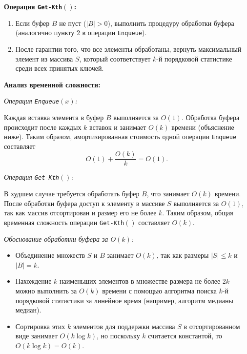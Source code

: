 \documentclass[11pt]{article}
\renewcommand{\leq}{\leqslant}  %
\begin{document}
\begin{solution}
    \textbf{Операция \texttt{Get-Kth}$()$:}

    \begin{enumerate}
        \item Если буфер $B$ не пуст ($|B| > 0$), выполнить процедуру обработки буфера (аналогично пункту 2 в операции \texttt{Enqueue}).
        \item После гарантии того, что все элементы обработаны, вернуть максимальный элемент из массива $S$, который соответствует $k$-й порядковой статистике среди всех принятых ключей.
    \end{enumerate}

    \textbf{Анализ временной сложности:}

    \textit{Операция \texttt{Enqueue}$(x)$:}

    Каждая вставка элемента в буфер $B$ выполняется за $O(1)$. Обработка буфера происходит после каждых $k$ вставок и занимает $O(k)$ времени (объяснение ниже). Таким образом, амортизированная стоимость одной операции \texttt{Enqueue} составляет
    \[
        O(1) + \frac{O(k)}{k} = O(1).
    \]

    \textit{Операция \texttt{Get-Kth}$()$:}

    В худшем случае требуется обработать буфер $B$, что занимает $O(k)$ времени. После обработки буфера доступ к элементу в массиве $S$ выполняется за $O(1)$, так как массив отсортирован и размер его не более $k$. Таким образом, общая временная сложность операции \texttt{Get-Kth}$()$ составляет $O(k)$.

    \textit{Обоснование обработки буфера за $O(k)$:}

    \begin{itemize}
        \item Объединение множеств $S$ и $B$ занимает $O(k)$, так как размеры $|S| \leq k$ и $|B| = k$.
        \item Нахождение $k$ наименьших элементов в множестве размера не более $2k$ можно выполнить за $O(k)$ времени с помощью алгоритма поиска $k$-й порядковой статистики за линейное время (например, алгоритм медианы медиан).
        \item Сортировка этих $k$ элементов для поддержки массива $S$ в отсортированном виде занимает $O(k \log k)$, но поскольку $k$ считается константой, то $O(k \log k) = O(k)$.
    \end{itemize}
\end{solution}
\end{document}
